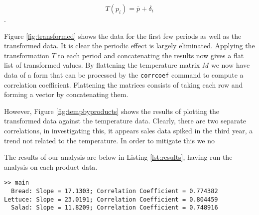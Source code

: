 $$ T(p_i) = \overline{p} + \delta_i $$.

Figure \ref{fig:transformed} shows the data for the first few periods as well as the transformed data. It is clear the periodic effect is largely eliminated. Applying the transformation $T$ to each period and concatenating the results now gives a flat list of transformed values. By flattening the temperature matrix $M$ we now have data of a form that can be processed by the \texttt{corrcoef} command to compute a correlation coefficient. Flattening the matrices consists of taking each row and forming a vector by concatenating them.


However, Figure \ref{fig:tempbyproducts} shows the results of plotting the transformed data against the temperature data. Clearly, there are two separate correlations, in investigating this, it appears sales data spiked in the third year, a trend not related to the temperature. In order to mitigate this we no

The results of our analysis are below in Listing \ref{lst:results}, having run the analysis on each product data.

\begin{verbatim}
>> main
  Bread: Slope = 17.1303; Correlation Coefficient = 0.774382
Lettuce: Slope = 23.0191; Correlation Coefficient = 0.804459
  Salad: Slope = 11.8209; Correlation Coefficient = 0.748916
\end{verbatim}

 


